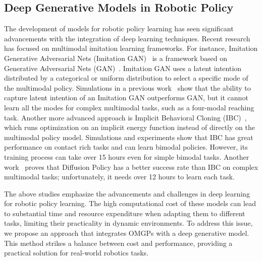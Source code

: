 \subsection{Deep Generative Models in Robotic Policy}
The development of models for robotic policy learning has seen significant advancements with the integration of deep learning techniques. Recent research has focused on multimodal imitation learning frameworks. For instance, Imitation Generative Adversarial Nets (Imitation GAN)~\cite{hausman2017multi} is a framework based on Generative Adversarial Nets (GAN)~\cite{creswell2018generative}. Imitation GAN uses a latent intention distributed by a categorical or uniform distribution to select a specific mode of the multimodal policy.
Simulations in a previous work~\cite{hausman2017multi} show that the ability to capture latent intention of an Imitation GAN outperforms GAN, but it cannot learn all the modes for complex multimodal tasks, such as a four-modal reaching task.
Another more advanced approach is Implicit Behavioral Cloning (IBC)~\cite{florence2022implicit}, which runs optimization on an implicit energy function instead of directly on the multimodal policy model. 
Simulations and experiments show that IBC has great performance on contact rich tasks and can learn bimodal policies. 
However, its training process can take over 15 hours even for simple bimodal tasks.
Another work~\cite{chi2023diffusion} proves that Diffusion Policy has a better success rate than IBC on complex multimodal tasks; unfortunately, it needs over 12 hours to learn each task.


The above studies emphasize the advancements and challenges in deep learning for robotic policy learning. The high computational cost of these models can lead to substantial time and resource expenditure when adapting them to different tasks, limiting their practicality in dynamic environments. To address this issue, we propose an approach that integrates OMGPs with a deep generative model. This method strikes a balance between cost and performance, providing a practical solution for real-world robotics tasks.